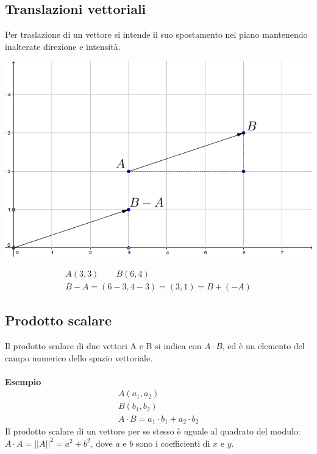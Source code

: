\documentclass[italian]{article}
\begin{document}
\subsection{Translazioni vettoriali}
Per traslazione di un vettore si intende il suo spostamento nel piano mantenendo inalterate direzione e intensità.\\
\begin{center}
	\includegraphics[width=0.6\linewidth]{img/vettori_1.png}	
\end{center}

\begin{align*}
	A(3,3) \qquad B(6,4) \\
	B-A=(6-3,4-3)=(3,1) = B + (-A)
\end{align*}
\subsection{Prodotto scalare}
Il prodotto scalare di due vettori A e B si indica con $A\cdot B$, ed è un elemento del campo numerico dello spazio vettoriale.\\\\
\textbf{Esempio}\\
\begin{gather*}
	A(a_1,a_2)\\
	B(b_1,b_2)\\
	A\cdot B = a_1\cdot b_1 + a_2\cdot b_2
\end{gather*}
Il prodotto scalare di un vettore per se stesso è uguale al quadrato del modulo: $A\cdot A = ||A||^2 = a^2 + b^2$, dove $a$ e $b$ sono i coefficienti di $x$ e $y$.

\pagebreak
\end{document}
